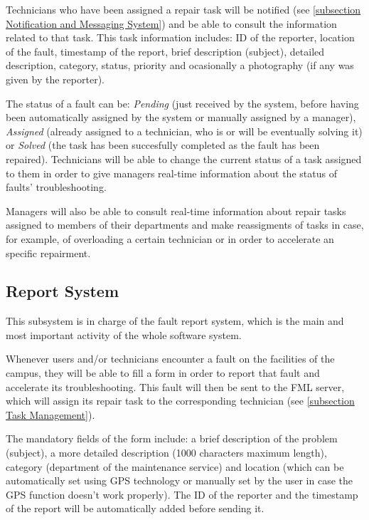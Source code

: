 Technicians who have been assigned a repair task will be notified (see \ref{subsection Notification and Messaging System}) and be able to consult the information related to that task. This task information includes: ID of the reporter, location of the fault, timestamp of the report, brief description (subject), detailed description, category, status, priority and ocasionally a photography (if any was given by the reporter).

The status of a fault can be: \emph{Pending} (just received by the system, before having been automatically assigned by the system or manually assigned by a manager), \emph{Assigned} (already assigned to a technician, who is or will be eventually solving it) or \emph{Solved} (the task has been succesfully completed as the fault has been repaired). Technicians will be able to change the current status of a task assigned to them in order to give managers real-time information about the status of faults' troubleshooting.

Managers will also be able to consult real-time information about repair tasks assigned to members of their departments and make reassigments of tasks in case, for example, of overloading a certain technician or in order to accelerate an specific repairment.

\subsection{Report System}
\label{subsection Report System}

This subsystem is in charge of the fault report system, which is the main and most important activity of the whole software system.

Whenever users and/or technicians encounter a fault on the facilities of the campus, they will be able to fill a form in order to report that fault and accelerate its troubleshooting. This fault will then be sent to the FML server, which will assign its repair task to the corresponding technician (see \ref{subsection Task Management}).

The mandatory fields of the form include: a brief description of the problem (subject), a more detailed description (1000 characters maximum length), category (department of the maintenance service) and location (which can be automatically set using GPS technology or manually set by the user in case the GPS function doesn't work properly). The ID of the reporter and the timestamp of the report will be automatically added before sending it.

